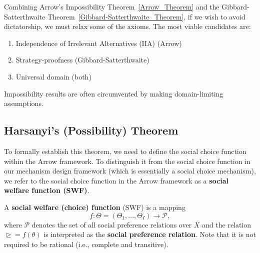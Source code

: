 \documentclass[11pt]{elegantbook_2}
\begin{document}
\begin{remark}
    Combining Arrow's Impossibility Theorem~\ref{Arrow_Theorem} and the Gibbard-Satterthwaite Theorem~\ref{Gibbard-Satterthwaite_Theorem}, if we wish to avoid dictatorship, we must relax some of the axioms. The most viable candidates are:
    \begin{enumerate}
        \item Independence of Irrelevant Alternatives (IIA) (Arrow)
        \item Strategy-proofness (Gibbard-Satterthwaite)
        \item Universal domain (both)
    \end{enumerate}
\end{remark}
\begin{note}
    Impossibility results are often circumvented by making domain-limiting assumptions.
\end{note}

\subsection{Harsanyi's (Possibility) Theorem}
To formally establish this theorem, we need to define the social choice function within the Arrow framework. To distinguish it from the social choice function in our mechanism design framework (which is essentially a social choice mechanism), we refer to the social choice function in the Arrow framework as a \textbf{social welfare function (SWF)}.

\begin{definition}
    A \textbf{social welfare (choice) function} (SWF) is a mapping $$f:\Theta=(\Theta_1,...,\Theta_I) \rightarrow \mathcal{P}, $$
    where $\mathcal{P}$ denotes the set of all social preference relations over $X$ and the relation $\trianglerighteq = f(\theta)$ is interpreted as the \textbf{social preference relation}. Note that it is not required to be rational (i.e., complete and transitive).
\end{definition}
\end{document}
